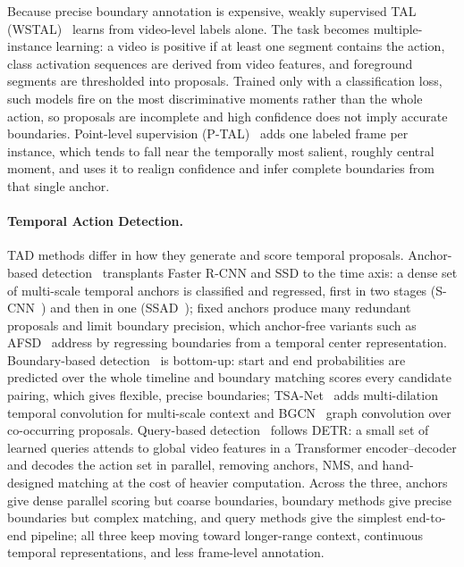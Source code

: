 Because precise boundary annotation is expensive, weakly supervised TAL (WSTAL)~\cite{shou2018autoloc,zhang2021cola,paul2018w} learns from video-level labels alone. The task becomes multiple-instance learning: a video is positive if at least one segment contains the action, class activation sequences are derived from video features, and foreground segments are thresholded into proposals. Trained only with a classification loss, such models fire on the most discriminative moments rather than the whole action, so proposals are incomplete and high confidence does not imply accurate boundaries. Point-level supervision (P-TAL)~\cite{xia2024realigning,lee2021learning,fu2022compact} adds one labeled frame per instance, which tends to fall near the temporally most salient, roughly central moment, and uses it to realign confidence and infer complete boundaries from that single anchor.


\paragraph{Temporal Action Detection.}
TAD methods differ in how they generate and score temporal proposals.
Anchor-based detection~\cite{gao2017turn} transplants Faster R-CNN and SSD to the time axis: a dense set of multi-scale temporal anchors is classified and regressed, first in two stages (S-CNN~\cite{shou2016temporal}) and then in one (SSAD~\cite{lin2017single}); fixed anchors produce many redundant proposals and limit boundary precision, which anchor-free variants such as AFSD~\cite{lin2021learning} address by regressing boundaries from a temporal center representation.
Boundary-based detection~\cite{xiong2017pursuit,lin2018bsn} is bottom-up: start and end probabilities are predicted over the whole timeline and boundary matching scores every candidate pairing, which gives flexible, precise boundaries; TSA-Net~\cite{gong2019scale} adds multi-dilation temporal convolution for multi-scale context and BGCN~\cite{chen2021boundary} graph convolution over co-occurring proposals.
Query-based detection~\cite{wu2021towards,shi2022react,kim2023self,zhu2024dual} follows DETR: a small set of learned queries attends to global video features in a Transformer encoder--decoder and decodes the action set in parallel, removing anchors, NMS, and hand-designed matching at the cost of heavier computation.
Across the three, anchors give dense parallel scoring but coarse boundaries, boundary methods give precise boundaries but complex matching, and query methods give the simplest end-to-end pipeline; all three keep moving toward longer-range context, continuous temporal representations, and less frame-level annotation.

